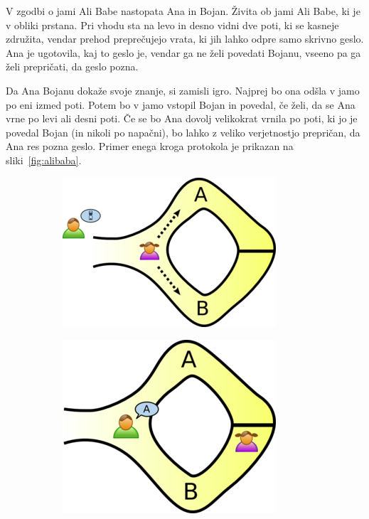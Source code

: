 \documentclass[isrm2, tisk]{fmfdelo}
\begin{document}
\begin{primer}
    V zgodbi o jami Ali Babe nastopata Ana in Bojan. Živita ob jami Ali Babe, ki je v obliki prstana. 
    Pri vhodu sta na levo in desno vidni dve poti, ki se kasneje združita, vendar prehod preprečujejo 
    vrata, ki jih lahko odpre samo skrivno geslo. Ana je ugotovila, kaj to geslo je, vendar ga ne želi 
    povedati Bojanu, vseeno pa ga želi prepričati, da geslo pozna. 

    Da Ana Bojanu dokaže svoje znanje, si zamisli igro. Najprej bo ona odšla v jamo po eni izmed poti. 
    Potem bo v jamo vstopil Bojan in povedal, če želi, da se Ana vrne po levi ali desni poti. Če se 
    bo Ana dovolj velikokrat vrnila po poti, ki jo je povedal Bojan (in nikoli po napačni), bo lahko 
    z veliko verjetnostjo prepričan, da Ana res pozna geslo. Primer enega kroga protokola je prikazan 
    na sliki~\ref{fig:alibaba}. 
    \begin{figure}[ht]
      \centering
        \begin{subfigure}{0.28\textwidth}
            \includegraphics[width=\textwidth]{images/zkp1.png}
        \end{subfigure}
        \hspace{0.25cm}
        \begin{subfigure}{0.25\textwidth}
            \includegraphics[width=\textwidth]{images/zkp2.png}

\end{subfigure}
\end{figure}
\end{primer}
\end{document}
